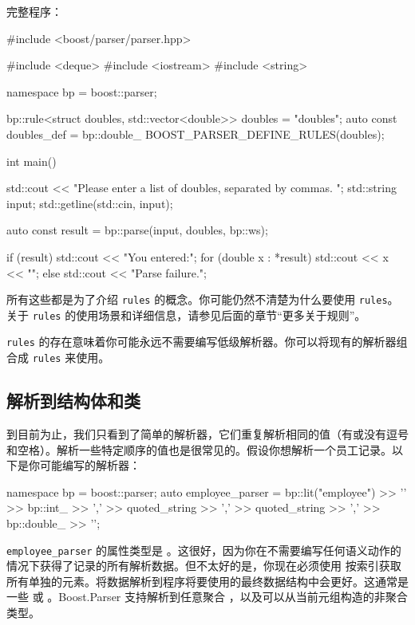 完整程序：

\begin{code}
#include <boost/parser/parser.hpp>

#include <deque>
#include <iostream>
#include <string>


namespace bp = boost::parser;


bp::rule<struct doubles, std::vector<double>> doubles = "doubles";
auto const doubles_def = bp::double_ %
BOOST_PARSER_DEFINE_RULES(doubles);

int main()
{
    std::cout << "Please enter a list of doubles, separated by commas. ";
    std::string input;
    std::getline(std::cin, input);

    auto const result = bp::parse(input, doubles, bp::ws);

    if (result) {
        std::cout << "You entered:\n";
        for (double x : *result) {
            std::cout << x << "\n";
        }
    } else {
        std::cout << "Parse failure.\n";
    }
}
\end{code}

所有这些都是为了介绍 \texttt{rules} 的概念。你可能仍然不清楚为什么要使用 \texttt{rules}。关于 \texttt{rules} 的使用场景和详细信息，请参见后面的章节“更多关于规则”。

\begin{marker}
\texttt{rules} 的存在意味着你可能永远不需要编写低级解析器。你可以将现有的解析器组合成 \texttt{rules} 来使用。
\end{marker}

\subsection{解析到结构体和类}

到目前为止，我们只看到了简单的解析器，它们重复解析相同的值（有或没有逗号和空格）。解析一些特定顺序的值也是很常见的。假设你想解析一个员工记录。以下是你可能编写的解析器：
\begin{code}
namespace bp = boost::parser;
auto employee_parser = bp::lit("employee")
    >> '{'
    >> bp::int_ >> ','
    >> quoted_string >> ','
    >> quoted_string >> ','
    >> bp::double_
    >> '}';
\end{code}

\texttt{employee\_parser} 的属性类型是 。这很好，因为你在不需要编写任何语义动作的情况下获得了记录的所有解析数据。但不太好的是，你现在必须使用  按索引获取所有单独的元素。将数据解析到程序将要使用的最终数据结构中会更好。这通常是一些  或 。Boost.Parser 支持解析到任意聚合 ，以及可以从当前元组构造的非聚合类型。

